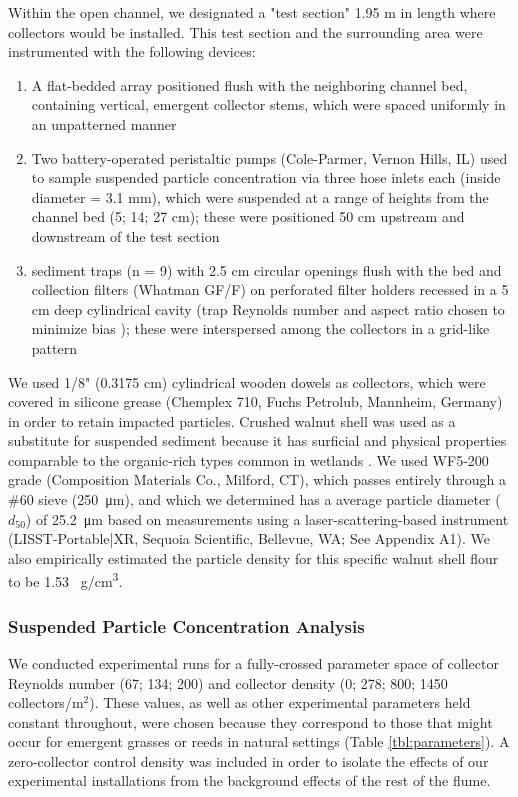 \documentclass[geosciences,article,submit,moreauthors,pdftex]{Definitions/mdpi}
\begin{document}
Within the open channel, we designated a "test section" 1.95 m in length where collectors would be installed. This test section and the surrounding area were instrumented with the following devices:
\begin{enumerate}
     \item A flat-bedded array positioned flush with the neighboring channel bed, containing vertical, emergent collector stems, which were spaced uniformly in an unpatterned manner
    \item Two battery-operated peristaltic pumps (Cole-Parmer, Vernon Hills, IL) used to sample suspended particle concentration via three hose inlets each (inside diameter = 3.1 mm), which were suspended at a range of heights from the channel bed (5; 14; 27 cm); these were positioned 50 cm upstream and downstream of the test section 
   \item sediment traps (n = 9) with 2.5 cm circular openings flush with the bed and collection filters (Whatman GF/F) on perforated filter holders recessed in a 5 cm deep cylindrical cavity (trap Reynolds number and aspect ratio chosen to minimize bias \cite{butman1986sediment}); these were interspersed among the collectors in a grid-like pattern
\end{enumerate}

We used 1/8" (0.3175 cm) cylindrical wooden dowels as collectors, which were covered in silicone grease (Chemplex 710, Fuchs Petrolub, Mannheim, Germany) in order to retain impacted particles. Crushed walnut shell was used as a substitute for suspended sediment because it has surficial and physical properties comparable to the organic-rich types common in wetlands \cite{muller2017experiments, jenzer2015sediment, redding2006particle}. We used WF5-200 grade (Composition Materials Co., Milford, CT), which passes entirely through a \#60 sieve (\SI{250}{\micro\metre}), and which we determined has a average particle diameter ($d_{50}$) of \SI{25.2}{\micro\metre} based on measurements using a laser-scattering-based instrument (LISST-Portable|XR, Sequoia Scientific, Bellevue, WA; See Appendix A1). We also empirically estimated the particle density for this specific walnut shell flour to be 1.53 \SI{}{\gram/\centi\metre\cubed}.

\subsubsection{Suspended Particle Concentration Analysis}

We conducted experimental runs for a fully-crossed parameter space of collector Reynolds number (67; 134; 200) and collector density (0; 278; 800; 1450 collectors/m$^2$). These values, as well as other experimental parameters held constant throughout, were chosen because they correspond to those that might occur for emergent grasses or reeds in natural settings (Table \ref{tbl:parameters}). A zero-collector control density was included in order to isolate the effects of our experimental installations from the background effects of the rest of the flume.   
\end{document}
